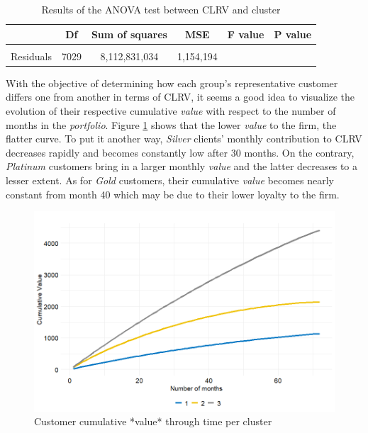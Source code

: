 \documentclass[
]{book}
\begin{document}
\begin{table}[H]

\caption{\label{tab:aov}Results of the ANOVA test between CLRV and cluster}
\centering
\begin{tabular}[t]{lccccc}
\toprule
  & Df & Sum of squares & MSE & F value & P value\\
\midrule
\cellcolor{gray!6}{Cluster} & \cellcolor{gray!6}{2} & \cellcolor{gray!6}{12,016,055,579} & \cellcolor{gray!6}{6,008,027,789} & \cellcolor{gray!6}{5,205.39} & \cellcolor{gray!6}{0}\\
Residuals & 7029 & 8,112,831,034 & 1,154,194 &  & \\
\bottomrule
\end{tabular}
\end{table}

With the objective of determining how each group's representative customer differs one from another in terms of CLRV, it seems a good idea to visualize the evolution of their respective cumulative \emph{value} with respect to the number of months in the \emph{portfolio}. Figure \ref{fig:clrvEvolutionClust} shows that the lower \emph{value} to the firm, the flatter curve. To put it another way, \emph{Silver} clients' monthly contribution to CLRV decreases rapidly and becomes constantly low after 30 months. On the contrary, \emph{Platinum} customers bring in a larger monthly \emph{value} and the latter decreases to a lesser extent. As for \emph{Gold} customers, their cumulative \emph{value} becomes nearly constant from month 40 which may be due to their lower loyalty to the firm.

\begin{figure}

{\centering \includegraphics[width=12.5in]{./imgs/clrv_evolution_per_cluster} 

}

\caption{Customer cumulative *value* through time per cluster}\label{fig:clrvEvolutionClust}
\end{figure}
\end{document}

